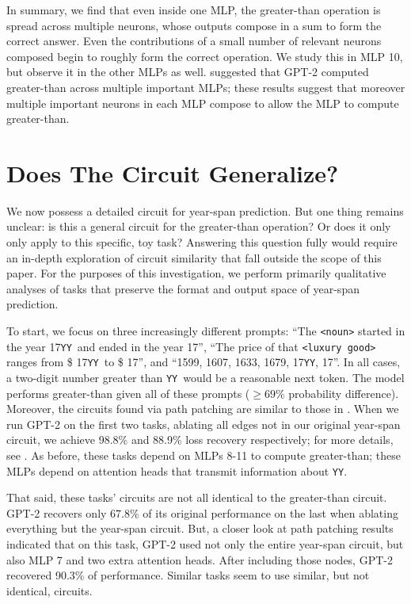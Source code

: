 \documentclass{article}
\newcommand{\YY}{\texttt{YY}}
\begin{document}
    In summary, we find that even inside one MLP, the greater-than operation is spread across multiple neurons, whose outputs compose in a sum to form the correct answer. Even the contributions of a small number of relevant neurons composed begin to roughly form the correct operation. We study this in MLP 10, but observe it in the other MLPs as well.  suggested that GPT-2 computed greater-than across multiple important MLPs; these results suggest that moreover multiple important neurons in each MLP compose to allow the MLP to compute greater-than.

        
    \section{Does The Circuit Generalize?}\label{sec:generalization}
    We now possess a detailed circuit for year-span prediction. But one thing remains unclear: is this a general circuit for the greater-than operation? Or does it only only apply to this specific, toy task? Answering this question fully would require  an in-depth exploration of circuit similarity that fall outside the scope of this paper. For the purposes of this investigation, we perform primarily qualitative analyses of tasks that preserve the format and output space of year-span prediction. 

    To start, we focus on three increasingly different prompts: ``The \texttt{<noun>} started in the year 17\YY\ and ended in the year 17'', ``The price of that \texttt{<luxury good>} ranges from \$ 17\YY\ to \$ 17'', and ``1599, 1607, 1633, 1679, 17\YY, 17''. In all cases, a two-digit number greater than \YY\ would be a reasonable next token. The model performs greater-than given all of these prompts ($\geq 69\%$ probability difference). Moreover, the circuits found via path patching are similar to those in . When we run GPT-2 on the first two tasks, ablating all edges not in our original year-span circuit, we achieve 98.8\% and 88.9\% loss recovery respectively; for more details, see . As before, these tasks depend on MLPs 8-11 to compute greater-than; these MLPs depend on attention heads that transmit information about \YY. 
    
    That said, these tasks' circuits are not all identical to the greater-than circuit. GPT-2 recovers only 67.8\% of its original performance on the last when ablating everything but the year-span circuit. But, a closer look at path patching results indicated that on this task, GPT-2 used not only the entire year-span circuit, but also MLP 7 and two extra attention heads. After including those nodes, GPT-2 recovered 90.3\% of performance. Similar tasks seem to use similar, but not identical, circuits.
\end{document}
